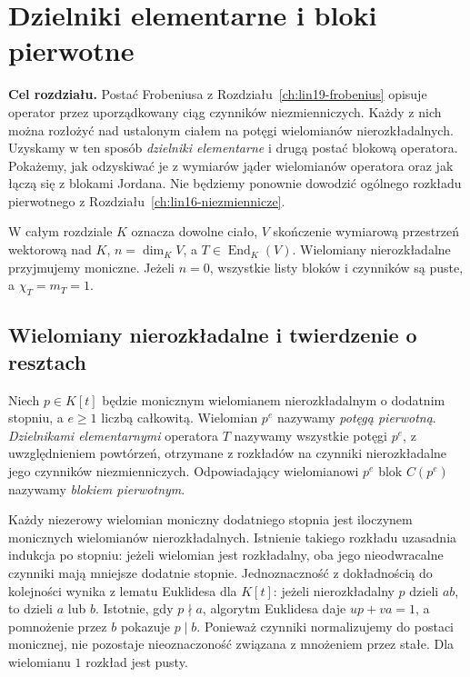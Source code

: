 \chapter{Dzielniki elementarne i bloki pierwotne}
\label{ch:lin20-elementary}

\providecommand{\atlasref}[2]{#2}


\noindent\textbf{Cel rozdziału.}
Postać Frobeniusa z Rozdziału~\ref{ch:lin19-frobenius}
opisuje operator przez uporządkowany ciąg
czynników niezmienniczych. Każdy z nich
można rozłożyć nad ustalonym ciałem
na potęgi wielomianów nierozkładalnych.
Uzyskamy w ten sposób \emph{dzielniki elementarne}
i drugą postać blokową operatora.
Pokażemy, jak odzyskiwać je z wymiarów jąder
wielomianów operatora oraz jak łączą się
z blokami Jordana. Nie będziemy ponownie
dowodzić ogólnego rozkładu pierwotnego
z Rozdziału~\ref{ch:lin16-niezmiennicze}.

W całym rozdziale \(K\) oznacza dowolne ciało,
\(V\) skończenie wymiarową przestrzeń wektorową
nad \(K\), \(n=\dim_K V\), a
\(T\in\operatorname{End}_K(V)\).
Wielomiany nierozkładalne przyjmujemy moniczne.
Jeżeli \(n=0\), wszystkie listy bloków
i czynników są puste, a
\(\chi_T=m_T=1\).

\section{Wielomiany nierozkładalne i twierdzenie o resztach}
\label{sec:lin20-crt}

\begin{definicja}
\label{def:lin20-elementary}
Niech \(p\in K[t]\) będzie monicznym
wielomianem nierozkładalnym
o dodatnim stopniu, a \(e\ge1\)
liczbą całkowitą.
Wielomian \(p^e\) nazywamy
\emph{potęgą pierwotną}.
\emph{Dzielnikami elementarnymi}
operatora \(T\) nazywamy wszystkie
potęgi \(p^e\), z uwzględnieniem powtórzeń,
otrzymane z rozkładów na czynniki
nierozkładalne jego czynników niezmienniczych.
Odpowiadający wielomianowi \(p^e\)
blok \(C(p^e)\) nazywamy
\emph{blokiem pierwotnym}.
\end{definicja}

Każdy niezerowy wielomian moniczny
dodatniego stopnia jest iloczynem monicznych
wielomianów nierozkładalnych.
Istnienie takiego rozkładu uzasadnia
indukcja po stopniu: jeżeli wielomian
jest rozkładalny, oba jego nieodwracalne
czynniki mają mniejsze dodatnie stopnie.
Jednoznaczność z dokładnością do kolejności
wynika z lematu Euklidesa dla \(K[t]\):
jeżeli nierozkładalny \(p\) dzieli \(ab\),
to dzieli \(a\) lub \(b\).
Istotnie, gdy \(p\nmid a\),
algorytm Euklidesa daje
\(up+va=1\), a pomnożenie przez \(b\)
pokazuje \(p\mid b\).
Ponieważ czynniki normalizujemy do postaci
monicznej, nie pozostaje nieoznaczoność
związana z mnożeniem przez stałe.
Dla wielomianu \(1\) rozkład jest pusty.

